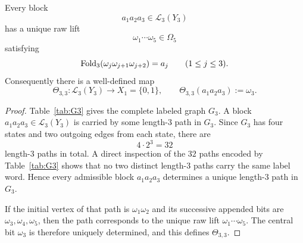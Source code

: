 \begin{proposition}
\label{prop:G3-base-case}
Every block
\[
a_1a_2a_3\in\mathcal L_3(Y_3)
\]
has a unique raw lift
\[
\omega_1\cdots\omega_5\in\Omega_5
\]
satisfying
\[
\operatorname{Fold}_3(\omega_j\omega_{j+1}\omega_{j+2})=a_j
\qquad (1\le j\le 3).
\]
Consequently there is a well-defined map
\[
\Theta_{3,3}:\mathcal L_3(Y_3)\to X_1=\{0,1\},
\qquad
\Theta_{3,3}(a_1a_2a_3):=\omega_3.
\]
\end{proposition}

\begin{proof}
Table~\ref{tab:G3} gives the complete labeled graph $G_3$.  A block
$a_1a_2a_3\in\mathcal L_3(Y_3)$ is carried by some length-$3$ path in $G_3$.
Since $G_3$ has four states and two outgoing edges from each state, there are
\[
4\cdot 2^3=32
\]
length-$3$ paths in total.  A direct inspection of the $32$ paths encoded by
Table~\ref{tab:G3} shows that no two distinct length-$3$ paths carry the same
label word.  Hence every admissible block $a_1a_2a_3$ determines a unique
length-$3$ path in $G_3$.

If the initial vertex of that path is $\omega_1\omega_2$ and its successive
appended bits are $\omega_3,\omega_4,\omega_5$, then the path corresponds to
the unique raw lift $\omega_1\cdots\omega_5$.  The central bit $\omega_3$ is
therefore uniquely determined, and this defines $\Theta_{3,3}$.
\end{proof}
